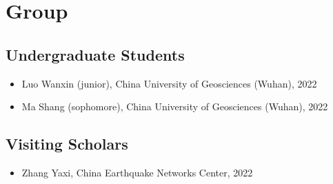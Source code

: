 \section{Group}

\subsection{Undergraduate Students}
\begin{itemize}
\item Luo Wanxin (junior), China University of Geosciences (Wuhan), 2022
\item Ma Shang (sophomore), China University of Geosciences (Wuhan), 2022
\end{itemize}

\subsection{Visiting Scholars}
\begin{itemize}
\item Zhang Yaxi, China Earthquake Networks Center, 2022
\end{itemize}
